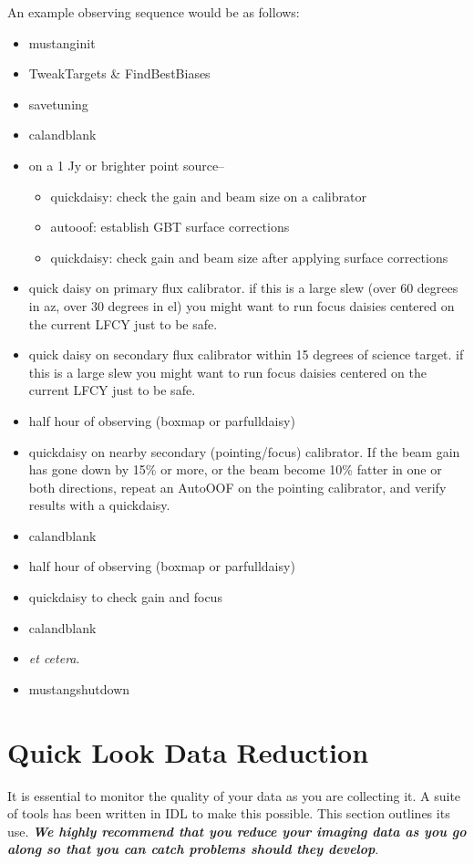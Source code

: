 An example observing sequence would be as follows:
\begin{itemize}
\item mustanginit
\item TweakTargets \& FindBestBiases
\item savetuning
\item calandblank
\item on a 1 Jy or brighter point source--
\begin{itemize}
\item quickdaisy: check the gain and beam size on a calibrator
\item autooof: establish GBT surface corrections
\item quickdaisy: check gain and beam size after applying surface corrections
\end{itemize}
\item quick daisy on primary flux calibrator. if this is a large slew (over 60 degrees in az, over 30 degrees
in el) you might want to run focus daisies centered on the current LFCY just to be safe.
\item quick daisy on secondary flux calibrator within 15 degrees of science target. if this is a large slew you might want to run focus daisies centered on the current LFCY just to be safe.
\item half hour of observing (boxmap or parfulldaisy)
\item quickdaisy on nearby secondary (pointing/focus) calibrator. If the beam gain has gone down by 15\% or more, or the beam become 10\%
fatter in one or both directions, repeat an AutoOOF on the pointing calibrator, and verify results with a quickdaisy.\item calandblank
\item half hour of observing (boxmap or parfulldaisy)
\item quickdaisy to check gain and focus
\item calandblank
\item {\it et cetera}.
\item mustangshutdown
\end{itemize}

\section{Quick Look Data Reduction}\label{sec:musdatareduc}

It is essential to monitor the quality of your data as you are
collecting it. A suite of tools has been written in IDL to make this
possible. This section outlines its use.  {\it \bf We highly recommend
that you reduce your imaging data as you go along so that you can
catch problems should they develop}.

